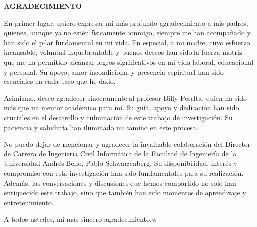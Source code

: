 \begin{center}
    \textbf{\LARGE AGRADECIMIENTO}
\end{center}

\fontsize{12}{14}\selectfont
En primer lugar, quiero expresar mi más profundo agradecimiento a mis padres, quienes, aunque ya no estén físicamente conmigo, siempre me han acompañado y han sido el pilar fundamental en mi vida. En especial, a mi madre, cuyo esfuerzo incansable, voluntad inquebrantable y buenos deseos han sido la fuerza motriz que me ha permitido alcanzar logros significativos en mi vida laboral, educacional y personal. Su apoyo, amor incondicional y presencia espiritual han sido esenciales en cada paso que he dado.

Asimismo, deseo agradecer sinceramente al profesor Billy Peralta, quien ha sido más que un mentor académico para mí. Su guía, apoyo y dedicación han sido cruciales en el desarrollo y culminación de este trabajo de investigación. Su paciencia y sabiduría han iluminado mi camino en este proceso.

No puedo dejar de mencionar y agradecer la invaluable colaboración del Director de Carrera de Ingeniería Civil Informática de la Facultad de Ingeniería de la Universidad Andrés Bello, Pablo Schwarzenberg. Su disponibilidad, interés y compromiso con esta investigación han sido fundamentales para su realización. Además, las conversaciones y discusiones que hemos compartido no solo han enriquecido este trabajo, sino que también han sido momentos de aprendizaje y entretenimiento.

A todos ustedes, mi más sincero agradecimiento.w
